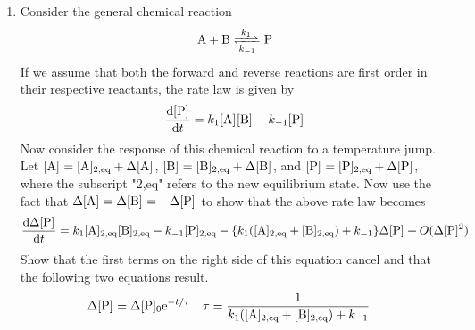 \documentclass[../psets.tex]{subfiles}
\begin{document}
\begin{enumerate}[label={\textbf{28-\arabic*.}},leftmargin=3.5em]
\begin{proof}[Answer]
        \begin{align*}
            -(n-1) &\approx -0.96\\
            n-1 &\approx 0.96\\
            n &\approx 1.96\\
            \Aboxed{n &= 2}
        \end{align*}
        It follows by plugging our four data points back into the equation
        \begin{equation*}
            k = \frac{1}{(2-1)t_{1/2}}\frac{2^{2-1}-1}{\cnc[0]{N2O}^{2-1}}
            = \frac{1}{t_{1/2}\cdot\cnc[0]{N2O}}
        \end{equation*}
        and averaging the results that
        \begin{equation*}
            \boxed{k = \SI[per-mode=fraction,fraction-function=\tfrac]{0.47}{\liter\per\mole\per\second}}
        \end{equation*}
    \end{proof}
    \item Consider the general chemical reaction
    \begin{equation*}
        \ce{A + B <=>[$k_1$][$k_{-1}$] P}
    \end{equation*}
    If we assume that both the forward and reverse reactions are first order in their respective reactants, the rate law is given by
    \begin{equation*}
        \dv{\cnc{P}}{t} = k_1\cnc{A}\cnc{B}-k_{-1}\cnc{P}
    \end{equation*}
    Now consider the response of this chemical reaction to a temperature jump. Let $\cnc{A}=\cnc[2,eq]{A}+\Delta\cnc{A}$, $\cnc{B}=\cnc[2,eq]{B}+\Delta\cnc{B}$, and $\cnc{P}=\cnc[2,eq]{P}+\Delta\cnc{P}$, where the subscript "2,eq" refers to the new equilibrium state. Now use the fact that $\Delta\cnc{A}=\Delta\cnc{B}=-\Delta\cnc{P}$ to show that the above rate law becomes
    \begin{equation*}
        \dv{\Delta\cnc{P}}{t} = k_1\cnc[2,eq]{A}\cnc[2,eq]{B}-k_{-1}\cnc[2,eq]{P}-\{k_1(\cnc[2,eq]{A}+\cnc[2,eq]{B})+k_{-1}\}\Delta\cnc{P}+O(\Delta\cnc{P}^2)
    \end{equation*}
    Show that the first terms on the right side of this equation cancel and that the following two equations result.
    \begin{align*}
        \Delta\cnc{P} &= \Delta\cnc[0]{P}\e[-t/\tau]&
        \tau &= \frac{1}{k_1(\cnc[2,eq]{A}+\cnc[2,eq]{B})+k_{-1}}
    \end{align*}

\end{enumerate}
\end{document}
